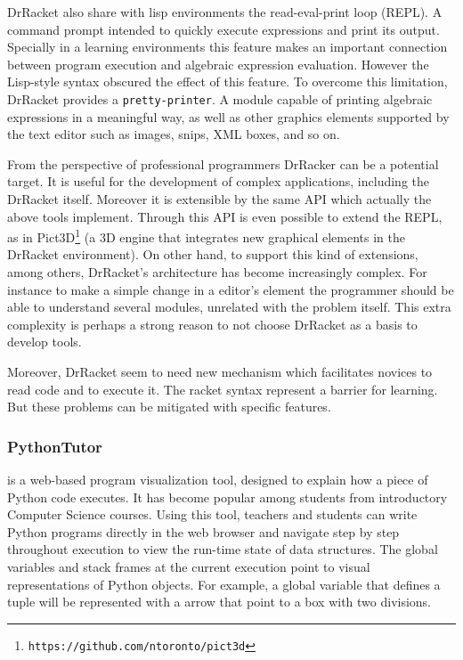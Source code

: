 DrRacket also share with lisp environments the read-eval-print loop (REPL). A command prompt intended to quickly execute expressions and print its output. Specially in a learning environments this feature makes an important connection between program execution and algebraic expression evaluation. However the Lisp-style syntax obscured the effect of this feature. To overcome this limitation, DrRacket provides a \texttt{pretty-printer}. A module capable of printing algebraic expressions in a meaningful way, as well as other graphics elements supported by the text editor such as images, snips, XML boxes, and so on.

From the perspective of professional programmers DrRacker can be a potential target. It is useful for the development of complex applications, including the DrRacket itself. Moreover it is extensible by the same API which actually the above tools implement. Through this API is even possible to extend the REPL, as in Pict3D\footnote{\texttt{https://github.com/ntoronto/pict3d}} (a 3D engine that integrates new graphical elements in the DrRacket environment). On other hand, to support this kind of extensions, among others, DrRacket's architecture has become increasingly complex. For instance to make a simple change in a editor's element the programmer should be able to understand several modules, unrelated with the problem itself. This extra complexity is perhaps a strong reason to not choose DrRacket as a basis to develop tools.

Moreover, DrRacket seem to need new mechanism which facilitates novices to read code and to execute it. The racket syntax represent a barrier for learning. But these problems can be mitigated with specific features.
\subsubsection{PythonTutor~\cite{GuoSIGCSE2013}} is a web-based program visualization tool, designed to explain how a piece of Python code executes. It has become popular among students from introductory Computer Science courses. Using this tool, teachers and students can write Python programs directly in the web browser and navigate step by step throughout execution to view the run-time state of data structures. The global variables and stack frames at the current execution point to visual representations of Python objects. For example, a global variable that defines a tuple will be represented with a arrow that point to a box with two divisions.

